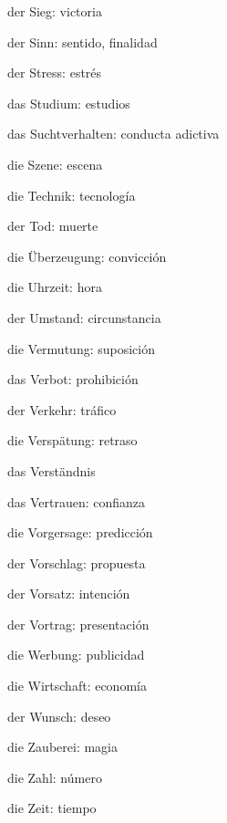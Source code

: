 \begin{multicols}{2}
\begin{myitemize}
\item der Sieg: victoria
\item der Sinn: sentido, finalidad
\item der Stress: estrés
\item das Studium: estudios
\item das Suchtverhalten: conducta adictiva
\item die Szene: escena
\item die Technik: tecnología
\item der Tod: muerte
\item die Überzeugung: convicción
\item die Uhrzeit: hora
\item der Umstand: circunstancia
\item die Vermutung: suposición
\item das Verbot: prohibición
\item der Verkehr: tráfico
\item die Verspätung: retraso
\item das Verständnis
\item das Vertrauen: confianza
\item die Vorgersage: predicción
\item der Vorschlag: propuesta
\item der Vorsatz: intención
\item der Vortrag: presentación
\item die Werbung: publicidad
\item die Wirtschaft: economía
\item der Wunsch: deseo
\item die Zauberei: magia
\item die Zahl: número
\item die Zeit: tiempo
\end{myitemize}
\end{multicols}


